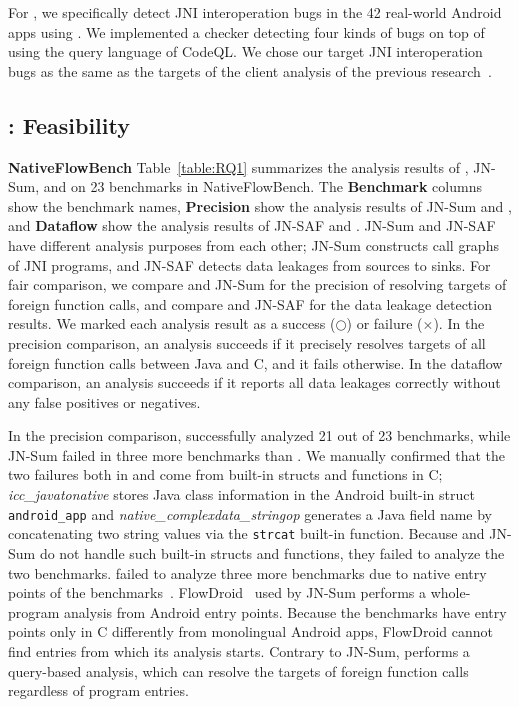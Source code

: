 For , we specifically detect JNI interoperation bugs in the 42 real-world Android
apps using \ours. We implemented a checker detecting four kinds of
bugs on top of \ours using the query language of CodeQL. We chose our target
JNI interoperation bugs as the same as the targets of the client
analysis of the previous research~\cite{LeeASE20, ILEA}.

\subsection{: Feasibility}
\textbf{NativeFlowBench} Table~\ref{table:RQ1} summarizes the analysis results of \ours, JN-Sum,
and \jnsaf on 23 benchmarks in NativeFlowBench.
The {\bf Benchmark} columns show the benchmark names,
{\bf Precision} show the analysis results of 
JN-Sum and \ours, and {\bf Dataflow} show the analysis results of JN-SAF and \ours.
JN-Sum and JN-SAF have different analysis purposes from
each other; JN-Sum constructs call graphs of JNI programs, and JN-SAF
detects data leakages from sources to sinks.  For fair comparison, we compare
\ours and JN-Sum for the precision of resolving targets of foreign
function calls, and compare \ours and JN-SAF for the data leakage detection results.
We marked each analysis result as a success ($\bigcirc$) or failure ($\times$).
In the precision comparison, an analysis succeeds if
it precisely resolves targets of all foreign function calls between Java and C, and it fails otherwise.
In the dataflow comparison, an analysis succeeds
if it reports all data leakages correctly without any false positives or negatives.


In the precision comparison, \ours successfully analyzed 21 out of 23
benchmarks, while JN-Sum failed in three more benchmarks than \ours.
We manually confirmed that the two failures both in \lees and \ours
come from built-in structs and functions in C; {\it
icc\_javatonative} stores Java class information in the Android built-in
struct {\tt android\_app} and {\it native\_complexdata\_stringop} generates
a Java field name by concatenating two string values via the {\tt strcat} built-in function.
  Because \ours and JN-Sum do not handle such built-in
structs and functions, they failed to analyze the two benchmarks.
  \lees failed to analyze three more benchmarks due to native entry points
of the benchmarks~\cite{nativeactivity}.
  FlowDroid~\cite{Flowdroid} used by JN-Sum performs a whole-program
analysis from Android entry points. 
  Because the benchmarks have entry points only in C differently from monolingual
Android apps, FlowDroid cannot find entries from which its analysis starts.
  Contrary to JN-Sum, \ours performs a query-based
analysis, which can resolve the targets of foreign function calls regardless of program entries.

